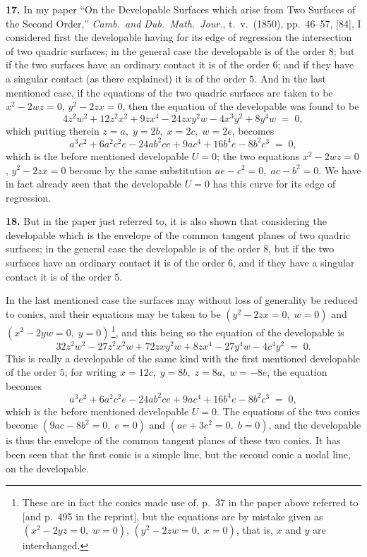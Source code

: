 \documentclass[11pt,a4paper]{article}
\begin{document}
\textbf{17.} In my paper ``On the Developable Surfaces which arise from Two Surfaces of the Second Order,'' \textit{Camb.\ and Dub.\ Math.\ Jour.}, t.~v.\ (1850), pp.~46--57, [84], I considered first the developable having for its edge of regression the intersection of two quadric surfaces; in the general case the developable is of the order $8$; but if the two surfaces have an ordinary contact it is of the order $6$; and if they have a singular contact (as there explained) it is of the order $5$. And in the last mentioned case, if the equations of the two quadric surfaces are taken to be $x^2 - 2wz = 0$, $y^2 - 2zx = 0$, then the equation of the developable was found to be
\[
4z^2 w^2 + 12 z^2 x^2 + 9zx^4 - 24 zxy^2 w - 4x^3 y^2 + 8y^4 w \;=\; 0,
\]
which putting therein $z = a,\;y = 2b,\;x = 2c,\;w = 2e$, becomes
\[
a^3 e^2 + 6a^2 c^2 e - 24 ab^2 ce + 9 ac^4 + 16 b^4 e - 8 b^2 c^3 \;=\; 0,
\]
which is the before mentioned developable $U = 0$; the two equations $x^2 - 2wz = 0$, $y^2 - 2zx = 0$ become by the same substitution $ae - c^2 = 0,\;ac - b^2 = 0$. We have in fact already seen that the developable $U = 0$ has this curve for its edge of regression.

\medskip

\textbf{18.} But in the paper just referred to, it is also shown that considering the developable which is the envelope of the common tangent planes of two quadric surfaces; in the general case the developable is of the order $8$, but if the two surfaces have an ordinary contact it is of the order $6$, and if they have a singular contact it is of the order $5$.

\medskip

In the last mentioned case the surfaces may without loss of generality be reduced to conics, and their equations may be taken to be $(y^2 - 2zx = 0,\;w = 0)$ and $(x^2 - 2yw = 0,\;y = 0)$\,\footnote{These are in fact the conics made use of, p.~37 in the paper above referred to [and p.~495 in the reprint], but the equations are by mistake given as $(x^2 - 2yz = 0,\;w = 0)$, $(y^2 - 2zw = 0,\;x = 0)$, that is, $x$ and $y$ are interchanged.}, and this being so the equation of the developable is
\[
32 z^2 w^2 - 27 z^2 x^2 w + 72 zxy^2 w + 8 zx^4 - 27 y^4 w - 4 c^4 y^2 \;=\; 0.
\]
This is really a developable of the same kind with the first mentioned developable of the order $5$; for writing $x = 12c,\;y = 8b,\;z = 8a,\;w = -8e$, the equation becomes
\[
a^3 e^2 + 6 a^2 c^2 e - 24 ab^2 ce + 9 ac^4 + 16 b^4 e - 8 b^2 c^3 \;=\; 0,
\]
which is the before mentioned developable $U = 0$. The equations of the two conics become $(9 ac - 8b^2 = 0,\;e = 0)$ and $(ae + 3c^2 = 0,\;b = 0)$, and the developable is thus the envelope of the common tangent planes of these two conics. It has been seen that the first conic is a simple line, but the second conic a nodal line, on the developable.
\end{document}
